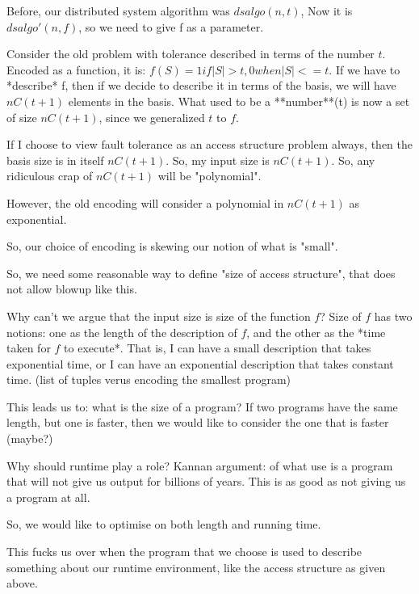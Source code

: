 \begin{itemize}
        Before, our distributed system algorithm was $dsalgo(n, t)$, Now it is
        $dsalgo'(n, f)$, so we need to give f as a parameter.


        Consider the old problem with tolerance described in terms of the
        number $t$. Encoded as a function, it is: $f(S) = 1 if |S| > t, 0 when |S| <= t$.
        If we have to *describe* f, then if we decide to describe it in terms
        of the basis, we will have $nC(t + 1)$ elements in the basis. 
        What used to be a **number**(t) is now a set of size $nC(t + 1)$, since
        we generalized $t$ to $f$.

        
        If I choose to view fault tolerance as an access structure problem
        always, then the basis size is in itself $nC(t + 1)$. So, my
        input size is $nC(t + 1)$. So, any ridiculous crap of $nC(t + 1)$ 
        will be "polynomial". 

        However, the old encoding will consider a polynomial in $nC(t + 1)$
        as exponential.

        So, our choice of encoding is skewing our notion of what is
        "small".

        So, we need some reasonable way to define "size of access structure",
        that does not allow blowup like this.


        Why can't we argue that the input size is size of the function $f$?
        Size of $f$ has two notions: one as the length of the description of $f$,
        and the other as the *time taken for $f$ to execute*. That is, 
        I can have a small description that takes exponential time, or I can
        have an exponential description that takes constant time.
        (list of tuples verus encoding the smallest program)

        This leads us to: what is the size of a program? If two programs
        have the same length, but one is faster, then we would like to 
        consider the one that is faster (maybe?)

        Why should runtime play a role? Kannan argument: of what use is a program
        that will not give us output for billions of years. This is as good as
        not giving us a program at all.

        So, we would like to optimise on both length and running time.


        This fucks us over when the program that we choose is used to
        describe something about our runtime environment, like the access
        structure as given above.



\end{itemize}
